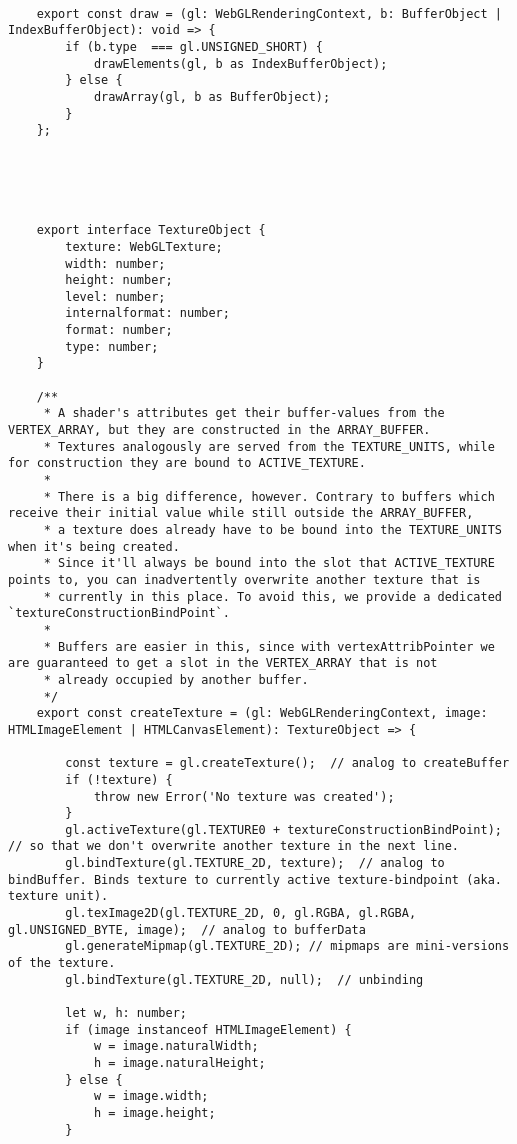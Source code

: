 {\begin{lstlisting}
    
    export const draw = (gl: WebGLRenderingContext, b: BufferObject | IndexBufferObject): void => {
        if (b.type  === gl.UNSIGNED_SHORT) {
            drawElements(gl, b as IndexBufferObject);
        } else {
            drawArray(gl, b as BufferObject);
        }
    };
    
    
    
    
    
    export interface TextureObject {
        texture: WebGLTexture;
        width: number;
        height: number;
        level: number;
        internalformat: number;
        format: number;
        type: number;
    }
    
    /**
     * A shader's attributes get their buffer-values from the VERTEX_ARRAY, but they are constructed in the ARRAY_BUFFER.
     * Textures analogously are served from the TEXTURE_UNITS, while for construction they are bound to ACTIVE_TEXTURE.
     *
     * There is a big difference, however. Contrary to buffers which receive their initial value while still outside the ARRAY_BUFFER,
     * a texture does already have to be bound into the TEXTURE_UNITS when it's being created.
     * Since it'll always be bound into the slot that ACTIVE_TEXTURE points to, you can inadvertently overwrite another texture that is
     * currently in this place. To avoid this, we provide a dedicated `textureConstructionBindPoint`.
     *
     * Buffers are easier in this, since with vertexAttribPointer we are guaranteed to get a slot in the VERTEX_ARRAY that is not
     * already occupied by another buffer.
     */
    export const createTexture = (gl: WebGLRenderingContext, image: HTMLImageElement | HTMLCanvasElement): TextureObject => {
    
        const texture = gl.createTexture();  // analog to createBuffer
        if (!texture) {
            throw new Error('No texture was created');
        }
        gl.activeTexture(gl.TEXTURE0 + textureConstructionBindPoint); // so that we don't overwrite another texture in the next line.
        gl.bindTexture(gl.TEXTURE_2D, texture);  // analog to bindBuffer. Binds texture to currently active texture-bindpoint (aka. texture unit).
        gl.texImage2D(gl.TEXTURE_2D, 0, gl.RGBA, gl.RGBA, gl.UNSIGNED_BYTE, image);  // analog to bufferData
        gl.generateMipmap(gl.TEXTURE_2D); // mipmaps are mini-versions of the texture.
        gl.bindTexture(gl.TEXTURE_2D, null);  // unbinding
    
        let w, h: number;
        if (image instanceof HTMLImageElement) {
            w = image.naturalWidth;
            h = image.naturalHeight;
        } else {
            w = image.width;
            h = image.height;
        }
    

\end{lstlisting}}
